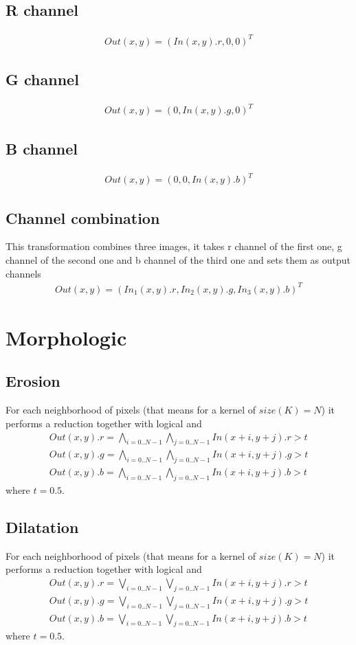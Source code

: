 \documentclass{article}
\begin{document}
\subsection{R channel}
\begin{gather*}
    Out(x,y) = (In(x,y).r, 0, 0)^T
\end{gather*}
\subsection{G channel}
\begin{gather*}
    Out(x,y) = (0, In(x,y).g, 0)^T
\end{gather*}
\subsection{B channel}
\begin{gather*}
    Out(x,y) = (0, 0, In(x,y).b)^T
\end{gather*}
\subsection{Channel combination}
This transformation combines three images, it takes r channel of the first one, g channel of the second one and b channel of the third one and sets them as output channels
\begin{gather*}
    Out(x,y) = (In_1(x,y).r, In_2(x,y).g, In_3(x,y).b)^T
\end{gather*}
\section{Morphologic}
\subsection{Erosion}
For each neighborhood of pixels (that means for a kernel of $size(K) = N$) it performs a reduction together with logical and 
\begin{gather*}
    Out(x,y).r = \bigwedge_{i=0..N-1} \bigwedge_{j=0..N-1}{In(x+i,y+j).r > t} \\
    Out(x,y).g= \bigwedge_{i=0..N-1} \bigwedge_{j=0..N-1}{In(x+i,y+j).g > t} \\
    Out(x,y).b = \bigwedge_{i=0..N-1} \bigwedge_{j=0..N-1}{In(x+i,y+j).b > t}
\end{gather*}
where $t=0.5$.
\subsection{Dilatation}
For each neighborhood of pixels (that means for a kernel of $size(K) = N$) it performs a reduction together with logical and 
\begin{gather*}
    Out(x,y).r = \bigvee_{i=0..N-1} \bigvee_{j=0..N-1}{In(x+i,y+j).r > t} \\
    Out(x,y).g= \bigvee_{i=0..N-1} \bigvee_{j=0..N-1}{In(x+i,y+j).g > t} \\
    Out(x,y).b = \bigvee_{i=0..N-1} \bigvee_{j=0..N-1}{In(x+i,y+j).b > t}
\end{gather*}
where $t=0.5$.
\end{document}
